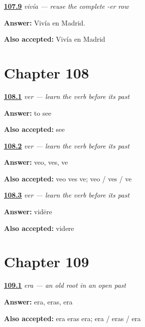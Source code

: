 \noindent\begin{minipage}[t]{\linewidth}
\raggedright
\hyperlink{review-ES-C16-vivir-imperfecto-vivia-madrid}{\textbf{107.9}} \emph{vivía — reuse the complete -er row}\par
\small \textbf{Answer:} Vivía en Madrid.\par
\footnotesize \textbf{Also accepted:} Vivía en Madrid
\end{minipage}\par\medskip

\section*{Chapter 108}

\noindent\begin{minipage}[t]{\linewidth}
\raggedright
\hyperlink{review-ES-C16-ver-meaning}{\textbf{108.1}} \emph{ver — learn the verb before its past}\par
\small \textbf{Answer:} to see\par
\footnotesize \textbf{Also accepted:} see
\end{minipage}\par\medskip

\noindent\begin{minipage}[t]{\linewidth}
\raggedright
\hyperlink{review-ES-C16-ver-present-singular}{\textbf{108.2}} \emph{ver — learn the verb before its past}\par
\small \textbf{Answer:} veo, ves, ve\par
\footnotesize \textbf{Also accepted:} veo ves ve; veo / ves / ve
\end{minipage}\par\medskip

\noindent\begin{minipage}[t]{\linewidth}
\raggedright
\hyperlink{review-ES-C16-ver-history}{\textbf{108.3}} \emph{ver — learn the verb before its past}\par
\small \textbf{Answer:} vidēre\par
\footnotesize \textbf{Also accepted:} videre
\end{minipage}\par\medskip

\section*{Chapter 109}

\noindent\begin{minipage}[t]{\linewidth}
\raggedright
\hyperlink{review-ES-C16-ser-imperfecto-singular-forms}{\textbf{109.1}} \emph{era — an old root in an open past}\par
\small \textbf{Answer:} era, eras, era\par
\footnotesize \textbf{Also accepted:} era eras era; era / eras / era
\end{minipage}\par\medskip

